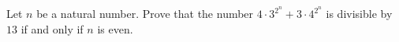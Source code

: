 Let $n$ be a natural number. Prove that the number $4 \cdot 3^{2^n}+ 3 \cdot4^{2^n}$ is divisible by $13$ if and only if $n$ is even.